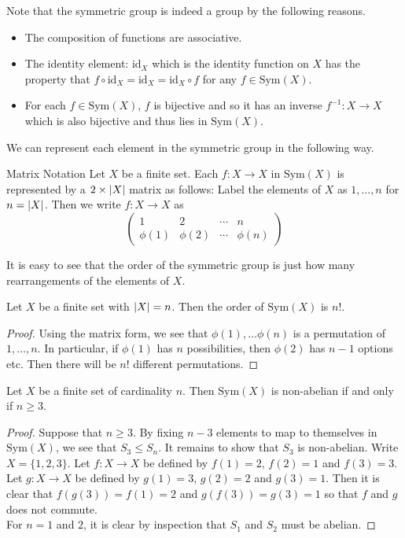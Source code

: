 \documentclass[a4paper]{article}
\begin{document}
Note that the symmetric group is indeed a group by the following reasons. 
\begin{itemize}
\item The composition of functions are associative. 
\item The identity element: $\text{id}_X$ which is the identity function on $X$ has the property that $f\circ\text{id}_X=\text{id}_X=\text{id}_X\circ f$ for any $f\in\text{Sym}(X)$. 
\item For each $f\in\text{Sym}(X)$, $f$ is bijective and so it has an inverse $f^{-1}:X\to X$ which is also bijective and thus lies in $\text{Sym}(X)$. 
\end{itemize}

We can represent each element in the symmetric group in the following way. 

\begin{defn}{Matrix Notation}{} Let $X$ be a finite set. Each $f:X\to X$ in $\text{Sym}(X)$ is represented by a $2\times\abs{X}$ matrix as follows: Label the elements of $X$ as $1,\dots,n$ for $n=\abs{X}$. Then we write $f:X\to X$ as $$\begin{pmatrix}
1 & 2 & \cdots & n\\
\phi(1) & \phi(2) & \cdots & \phi(n)
\end{pmatrix}$$
\end{defn}

It is easy to see that the order of the symmetric group is just how many rearrangements of the elements of $X$. 

\begin{lmm}{}{} Let $X$ be a finite set with $\abs{X}=n$. Then the order of $\text{Sym}(X)$ is $n!$. 
\begin{proof}
Using the matrix form, we see that $\phi(1),\dots\phi(n)$ is a permutation of $1,\dots,n$. In particular, if $\phi(1)$ has $n$ possibilities, then $\phi(2)$ has $n-1$ options etc. Then there will be $n!$ different permutations. 
\end{proof}
\end{lmm}

\begin{prp}{}{} Let $X$ be a finite set of cardinality $n$. Then $\text{Sym}(X)$ is non-abelian if and only if $n\geq 3$. 
\begin{proof}
Suppose that $n\geq 3$. By fixing $n-3$ elements to map to themselves in $\text{Sym}(X)$, we see that $S_3\leq S_n$. It remains to show that $S_3$ is non-abelian. Write $X=\{1,2,3\}$. Let $f:X\to X$ be defined by $f(1)=2$, $f(2)=1$ and $f(3)=3$. Let $g:X\to X$ be defined by $g(1)=3$, $g(2)=2$ and $g(3)=1$. Then it is clear that $f(g(3))=f(1)=2$ and $g(f(3))=g(3)=1$ so that $f$ and $g$ does not commute. \\

For $n=1$ and $2$, it is clear by inspection that $S_1$ and $S_2$ must be abelian. 
\end{proof}
\end{prp}
\end{document}
